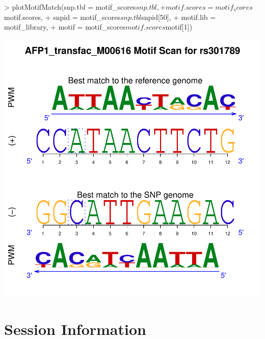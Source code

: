 \documentclass[a4paper,10pt]{article}
\begin{document}
\begin{Schunk}
\begin{Sinput}
> plotMotifMatch(snp.tbl = motif_scores$snp.tbl,
+                motif.scores = motif_scores$motif.scores,
+                snpid = motif_scores$snp.tbl$snpid[50],
+                motif.lib = motif_library,
+                motif = motif_scores$motif.scores$motif[1])
\end{Sinput}
\end{Schunk}
\includegraphics{atsnp-008}

\section{Session Information}
\end{document}
